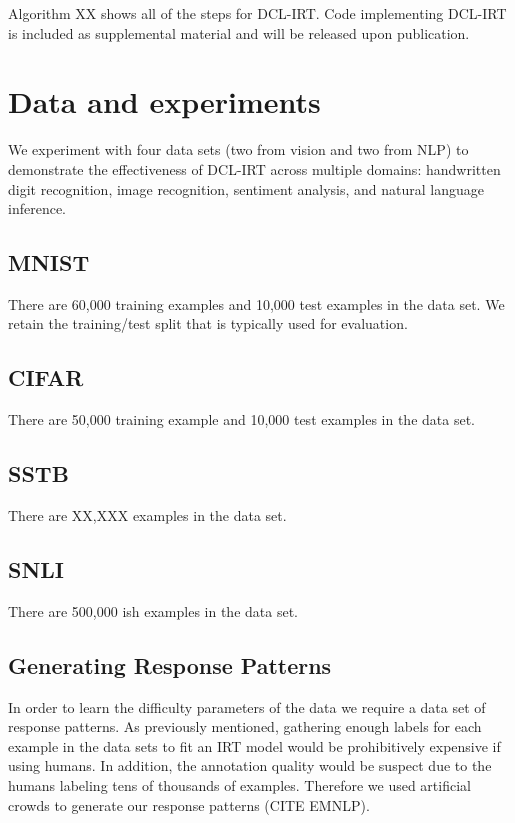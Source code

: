 \documentclass[letterpaper]{article} %
\begin{document}
Algorithm XX shows all of the steps for DCL-IRT. Code implementing DCL-IRT is included as supplemental material and will be released upon publication. 


\section{Data and experiments} 

We experiment with four data sets (two from vision and two from NLP) to demonstrate the effectiveness of DCL-IRT across multiple domains: handwritten digit recognition, image recognition, sentiment analysis, and natural language inference.

\subsection{MNIST}

There are 60,000 training examples and 10,000 test examples in the data set.
We retain the training/test split that is typically used for evaluation.

\subsection{CIFAR} 

There are 50,000 training example and 10,000 test examples in the data set.

\subsection{SSTB} 


There are XX,XXX examples in the data set.

\subsection{SNLI} 

There are 500,000 ish examples in the data set.

\subsection{Generating Response Patterns}

In order to learn the difficulty parameters of the data we require a data set of response patterns.
As previously mentioned, gathering enough labels for each example in the data sets to fit an IRT model would be prohibitively expensive if using humans.
In addition, the annotation quality would be suspect due to the humans labeling tens of thousands of examples.
Therefore we used artificial crowds to generate our response patterns (CITE EMNLP). 
\end{document}
